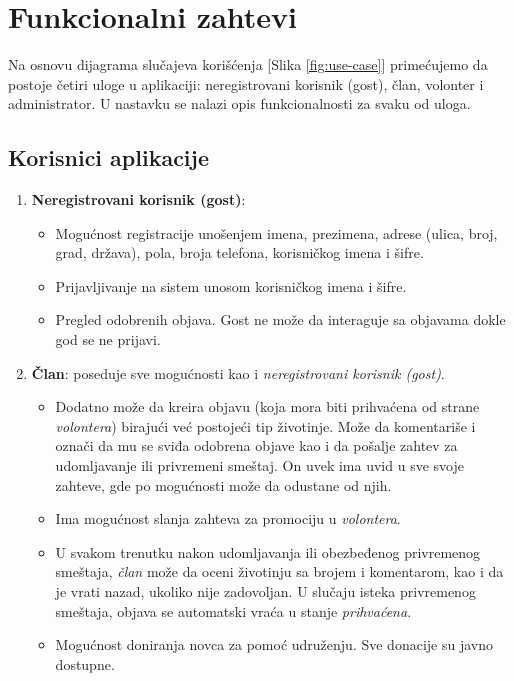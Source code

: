 \section{Funkcionalni zahtevi}
\par Na osnovu dijagrama slučajeva korišćenja [Slika \ref{fig:use-case}] primećujemo da postoje četiri uloge u aplikaciji: neregistrovani korisnik (gost), član, volonter i administrator. 
U nastavku se nalazi opis funkcionalnosti za svaku od uloga.
\subsection{Korisnici aplikacije}
\begin{enumerate}
    \item \textbf{Neregistrovani korisnik (gost)}: 
    \begin{itemize}
        \item Mogućnost registracije unošenjem imena, prezimena, adrese (ulica, broj, grad, država), pola, broja telefona, korisničkog imena i šifre.
        \item Prijavljivanje na sistem unosom korisničkog imena i šifre.
        \item Pregled odobrenih objava. Gost ne može da interaguje sa objavama dokle god se ne prijavi.
    \end{itemize}
    \item \textbf{Član}: poseduje sve mogućnosti kao i \textit{neregistrovani korisnik (gost)}. 
    \begin{itemize}
        \item Dodatno može da kreira objavu (koja mora biti prihvaćena od strane \textit{volontera}) birajući već postojeći tip životinje. Može da komentariše i označi da mu se sviđa odobrena 
        objave kao i da pošalje zahtev za udomljavanje ili privremeni smeštaj. On uvek ima uvid u sve svoje zahteve, gde po mogućnosti može da odustane od njih. 
        \item Ima mogućnost slanja zahteva za promociju u \textit{volontera}.
        \item U svakom trenutku nakon udomljavanja ili obezbeđenog privremenog sme\-štaja, \textit{član} može da oceni životinju sa brojem i komentarom, kao i da je vrati nazad, ukoliko nije 
        zadovoljan. U slučaju isteka privremenog smeštaja, objava se automatski vraća u stanje \textit{prihvaćena}.
        \item Mogućnost doniranja novca za pomoć udruženju. Sve donacije su javno dostupne.

\end{itemize}
\end{enumerate}
